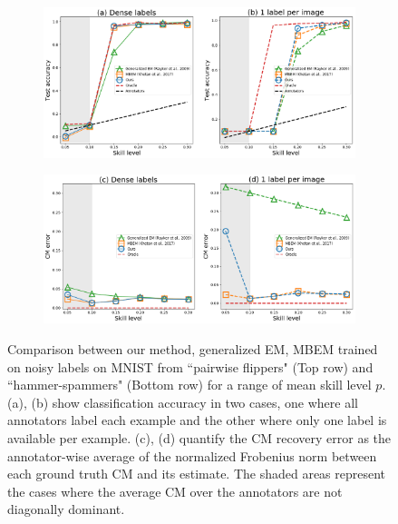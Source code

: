 \begin{figure}[ht]
	\begin{subfigure}[]{0.49\linewidth}
	\includegraphics[width=\linewidth]{chapter_4/figures/figures_new/figure_01.png}
	\end{subfigure}
	\begin{subfigure}[]{0.49\linewidth}
	\includegraphics[width=\linewidth]{chapter_4/figures/figures_new/figure_02.png}
	\end{subfigure}

	\caption{\small Comparison between our method, generalized EM, MBEM trained on noisy labels on MNIST from ``pairwise flippers" (Top row) and ``hammer-spammers" (Bottom row) for a range of mean skill level $p$. (a), (b) show classification accuracy in two cases, one where all annotators label each example and the other where only one label is available per example. (c), (d) quantify the CM recovery error as the annotator-wise average of the normalized Frobenius norm between each ground truth CM and its estimate. The shaded areas represent the cases where the average CM over the annotators are not diagonally dominant. }
	\label{fig:pairwise_flips}
\end{figure}


